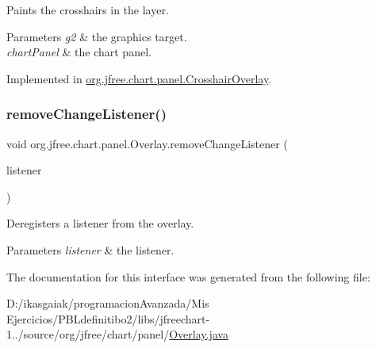 Paints the crosshairs in the layer.


\begin{DoxyParams}{Parameters}
{\em g2} & the graphics target. \\
\hline
{\em chart\+Panel} & the chart panel. \\
\hline
\end{DoxyParams}


Implemented in \mbox{\hyperlink{classorg_1_1jfree_1_1chart_1_1panel_1_1_crosshair_overlay_a1601884f0d667eab61c224336dc87145}{org.\+jfree.\+chart.\+panel.\+Crosshair\+Overlay}}.

\mbox{\label{interfaceorg_1_1jfree_1_1chart_1_1panel_1_1_overlay_a9f3320b02450b959d11045136952cca4}} 
\subsubsection{\texorpdfstring{remove\+Change\+Listener()}{removeChangeListener()}}
{\footnotesize\ttfamily void org.\+jfree.\+chart.\+panel.\+Overlay.\+remove\+Change\+Listener (\begin{DoxyParamCaption}\item[{\mbox{\hyperlink{interfaceorg_1_1jfree_1_1chart_1_1event_1_1_overlay_change_listener}{Overlay\+Change\+Listener}}}]{listener }\end{DoxyParamCaption})}

Deregisters a listener from the overlay.


\begin{DoxyParams}{Parameters}
{\em listener} & the listener. \\
\hline
\end{DoxyParams}


The documentation for this interface was generated from the following file\+:\begin{DoxyCompactItemize}
\item 
D\+:/ikasgaiak/programacion\+Avanzada/\+Mis Ejercicios/\+P\+B\+Ldefinitibo2/libs/jfreechart-\/1../source/org/jfree/chart/panel/\mbox{\hyperlink{_overlay_8java}{Overlay.\+java}}\end{DoxyCompactItemize}
